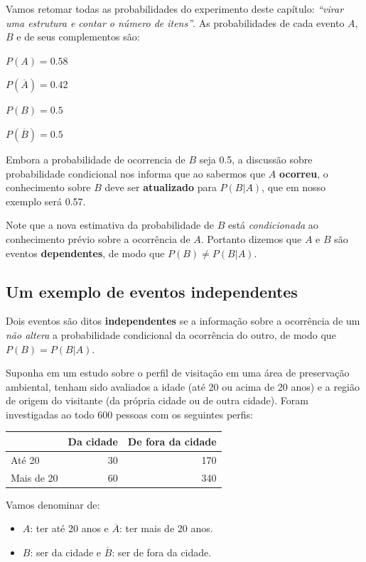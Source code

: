 \documentclass[
]{book}
\begin{document}
Vamos retomar todas as probabilidades do experimento deste capítulo: \emph{``virar uma estrutura e contar o número de itens''}. As probabilidades de cada evento \(A\), \(B\) e de seus complementos são:

\(P(A) = 0.58\)

\(P(\overline{A}) = 0.42\)

\(P(B) = 0.5\)

\(P(\overline{B}) = 0.5\)

Embora a probabilidade de ocorrencia de \(B\) seja 0.5, a discussão sobre probabilidade condicional nos informa que ao sabermos que \(A\) \textbf{ocorreu}, o conhecimento sobre \(B\) deve ser \textbf{atualizado} para \(P(B|A)\), que em nosso exemplo será 0.57.

Note que a nova estimativa da probabilidade de \(B\) está \emph{condicionada} ao conhecimento prévio sobre a ocorrência de \(A\). Portanto dizemos que \(A\) e \(B\) são eventos \textbf{dependentes}, de modo que \(P(B) \neq P(B|A)\).

\hypertarget{um-exemplo-de-eventos-independentes}{%
\subsection{Um exemplo de eventos independentes}\label{um-exemplo-de-eventos-independentes}}

Dois eventos são ditos \textbf{independentes} se a informação sobre a ocorrência de um \emph{não altera} a probabilidade condicional da ocorrência do outro, de modo que \(P(B) = P(B|A)\).

Suponha em um estudo sobre o perfil de visitação em uma área de preservação ambiental, tenham sido avaliados a idade (até 20 ou acima de 20 anos) e a região de origem do visitante (da própria cidade ou de outra cidade). Foram investigadas ao todo 600 pessoas com os seguintes perfis:

\begin{tabular}{l|r|r}
\hline
  & Da cidade & De fora da cidade\\
\hline
Até 20 & 30 & 170\\
\hline
Mais de 20 & 60 & 340\\
\hline
\end{tabular}

Vamos denominar de:

\begin{itemize}
\item
  \(A\): ter até 20 anos e \(\overline{A}\): ter mais de 20 anos.
\item
  \(B\): ser da cidade e \(\overline{B}\): ser de fora da cidade.
\end{itemize}
\end{document}
